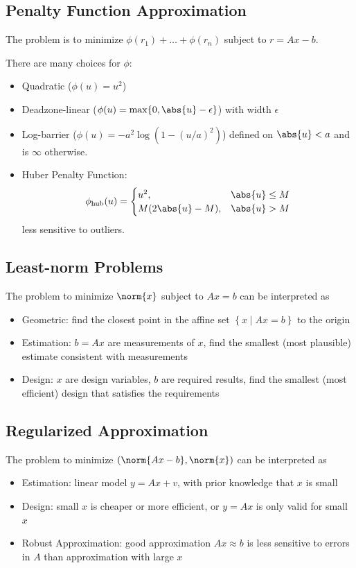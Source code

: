\documentclass[11pt]{article}
\begin{document}
\subsection{Penalty Function Approximation} 
The problem is to minimize $\phi(r_1) + \ldots + \phi(r_n)$ subject to $r = Ax - b$. \par 
There are many choices for $\phi$: 
\begin{itemize}
    \item Quadratic ($\phi(u) = u^2$)
    \item Deadzone-linear ($\phi(u) = \mathrm{max}\{ 0, \abs{u} - \epsilon \}$) with width $\epsilon$
    \item Log-barrier ($\phi(u) = -a^2\log (1 - (u/a)^2)$) defined on $\abs{u} < a$ and is $\infty$ otherwise. 
    \item Huber Penalty Function: 
    \[ \phi_{\text{hub}}(u) = \begin{cases}
        u^2, &\abs{u} \leq M \\ 
        M(2\abs{u} - M), &\abs{u} > M
    \end{cases} \]
    less sensitive to outliers.  
\end{itemize}

\subsection{Least-norm Problems} 
The problem to minimize $\norm{x}$ subject to $Ax = b$ can be interpreted as 
\begin{itemize}
    \item Geometric: find the closest point in the affine set $\left\{ x \mid Ax = b \right\}$ to the origin
    \item Estimation: $b = Ax$ are measurements of $x$, find the smallest (most plausible) estimate consistent with measurements
    \item Design: $x$ are design variables, $b$ are required results, find the smallest (most efficient) design that satisfies the requirements 
\end{itemize} 

\subsection{Regularized Approximation} 
The problem to minimize $(\norm{Ax - b}, \norm{x})$ can be interpreted as 
\begin{itemize}
    \item Estimation: linear model $y = Ax + v$, with prior knowledge that $x$ is small
    \item Design: small $x$ is cheaper or more efficient, or $y = Ax$ is only valid for small $x$
    \item Robust Approximation: good approximation $Ax \approx b$ is less sensitive to errors in $A$ than approximation with large $x$
\end{itemize}
\end{document}
